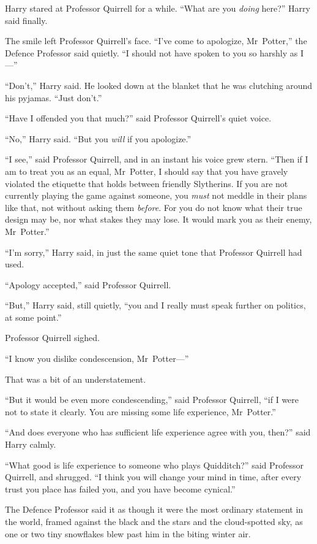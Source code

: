 Harry stared at Professor Quirrell for a while.
“What are you \emph{doing} here?” Harry said finally.

The smile left Professor Quirrell’s face.
“I’ve come to apologize, Mr~Potter,” the Defence Professor said quietly.
“I should not have spoken to you so harshly as I—”

“Don’t,” Harry said. He looked down at the blanket that he was clutching around his pyjamas.
“Just don’t.”

“Have I offended you that much?” said Professor Quirrell’s quiet voice.

“No,” Harry said.
“But you \emph{will} if you apologize.”

“I see,” said Professor Quirrell, and in an instant his voice grew stern.
“Then if I am to treat you as an equal, Mr~Potter, I should say that you have gravely violated the etiquette that holds between friendly Slytherins. If you are not currently playing the game against someone, you \emph{must} not meddle in their plans like that, not without asking them \emph{before}. For you do not know what their true design may be, nor what stakes they may lose. It would mark you as their enemy, Mr~Potter.”

“I’m sorry,” Harry said, in just the same quiet tone that Professor Quirrell had used.

“Apology accepted,” said Professor Quirrell.

“But,” Harry said, still quietly, “you and I really must speak further on politics, at some point.”

Professor Quirrell sighed.

“I know you dislike condescension, Mr~Potter—”

That was a bit of an understatement.

“But it would be even more condescending,” said Professor Quirrell, “if I were not to state it clearly. You are missing some life experience, Mr~Potter.”

“And does everyone who has sufficient life experience agree with you, then?” said Harry calmly.

“What good is life experience to someone who plays Quidditch?” said Professor Quirrell, and shrugged.
“I think you will change your mind in time, after every trust you place has failed you, and you have become cynical.”

The Defence Professor said it as though it were the most ordinary statement in the world, framed against the black and the stars and the cloud-spotted sky, as one or two tiny snowflakes blew past him in the biting winter air.

